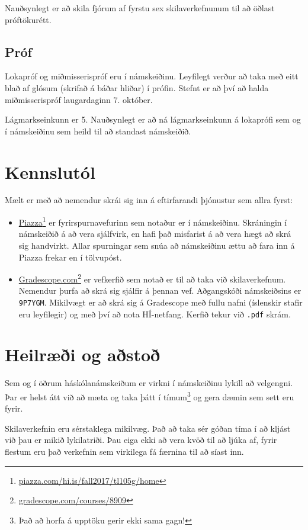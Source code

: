 \documentclass[justified, nobib]{tufte-handout}
\begin{document}
Nauðsynlegt er að skila fjórum af fyrstu sex skilaverkefnunum til að öðlast próftökurétt.
\subsection{Próf}
Lokapróf og miðmisserispróf eru í námskeiðinu. Leyfilegt verður að taka með eitt blað af glósum (skrifað á báðar hliðar) í prófin. Stefnt er að því að halda miðmisserispróf laugardaginn 7. október. 

Lágmarkseinkunn er 5. Nauðsynlegt er að ná lágmarkseinkunn á lokaprófi sem og í námskeiðinu sem heild til að standast námskeiðið. 
\section{Kennslutól}
\label{sec:tools}
Mælt er með að nemendur skrái sig inn á eftirfarandi þjónustur sem allra fyrst:
\begin{itemize}
 \item \href{piazza.com/hi.is/fall2017/tl105g/home}{Piazza}\footnote{\url{piazza.com/hi.is/fall2017/tl105g/home}} er fyrirspurnavefurinn sem notaður er í námskeiðinu. Skráningin í námskeiðið á að vera sjálfvirk, en hafi það misfarist á að vera hægt að skrá sig handvirkt. Allar spurningar sem snúa að námskeiðinu ættu að fara inn á Piazza frekar en í tölvupóst.
 \item \href{https://gradescope.com/courses/8909}{Gradescope.com}\footnote{\url{gradescope.com/courses/8909}} er vefkerfið sem notað er til að taka við skilaverkefnum. Nemendur þurfa að skrá sig sjálfir á þennan vef. Aðgangskóði námskeiðsins er \texttt{9P7YGM}. Mikilvægt er að skrá sig á Gradescope með fullu nafni (íslenskir stafir eru leyfilegir) og með því að nota HÍ-netfang. Kerfið tekur við \texttt{.pdf} skrám.
\end{itemize}

\section{Heilræði og aðstoð}
Sem og í öðrum háskólanámskeiðum er virkni í námskeiðinu lykill að velgengni. Þar er helst átt við að mæta og taka þátt í tímum\footnote{Það að horfa á upptöku gerir ekki sama gagn!} og gera dæmin sem sett eru fyrir.

Skilaverkefnin eru sérstaklega mikilvæg. Það að taka sér góðan tíma í að kljást við þau er mikið lykilatriði. Þau eiga ekki að vera kvöð til að ljúka af, fyrir flestum eru það verkefnin sem virkilega fá færnina til að síast inn.
\end{document}
